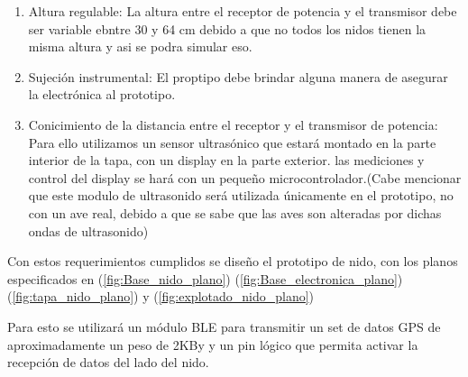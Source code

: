 \begin{enumerate}
También se calcula la impedancia de la madera como:
\begin{equation}
	\eta_{Madera}=\sqrt{\frac{\mu_{Madera}}{\varepsilon_{Madera}}}
\end{equation}

Es así que el coeficiente de reflexión se calcula de la siguiente forma:
\begin{equation}
	\Gamma = \frac{\eta_2 - \eta_1  }{\eta_2 + \eta_1} = -0.1714
	\label{eq:reflexion_madera}
\end{equation}

Se observa en la Ecuación (\ref{eq:reflexion_madera}) que el resultado presenta un valor negativo. Lo que esto implica es una inversión de fase en la onda electromagnética reflejada respecto de la incidente. Esto implica una interferencia destructiva, para determinar las implicancias de esta interferencai se calcula la potencia de la onda reflejada, siendo esta $P_{ref} = |\Gamma|^2 = 0.029$. Es así que se nota que menos de un $3\%$ de la potencia sera reflejada. De esta forma se puede afirmar que no habrá una interferencia significativa con la transmisión original.
Finalmente cabe notar que el resultado del coeficiente de reflexi\'pm no depende del espesor. \'Unicamente de la impedancia de los medios. Por lo que de aqu\'i se concluye que el espesor de la madera no juega un papel significativo en el prototipo de nido.
\item Altura regulable:
La altura entre el receptor de potencia y el transmisor debe ser variable ebntre 30 y 64 cm debido a que no todos los nidos tienen la misma altura y asi se podra simular eso.
\item Sujeci\'on instrumental:
El proptipo debe brindar alguna manera de asegurar la electr\'onica al prototipo.
\item Conicimiento de la distancia entre el receptor y el transmisor de potencia:
Para ello utilizamos un sensor ultrasónico que estará montado en la parte interior de la tapa, con un display en la parte exterior. las mediciones y control del display se hará con un pequeño microcontrolador.(Cabe mencionar que este modulo de ultrasonido ser\'a utilizada \'unicamente en el prototipo, no con un ave real, debido a que se sabe que las aves son alteradas por dichas ondas de ultrasonido)
\end{enumerate} 
Con estos requerimientos cumplidos se diseño el prototipo de nido, con los planos especificados en (\ref{fig:Base_nido_plano}) (\ref{fig:Base_electronica_plano}) (\ref{fig:tapa_nido_plano}) y (\ref{fig:explotado_nido_plano})

Para esto se utilizar\'a un m\'odulo BLE para transmitir un set de datos GPS de aproximadamente un peso de 2KBy y un pin l\'ogico que permita activar la recepci\'on de datos del lado del nido.


